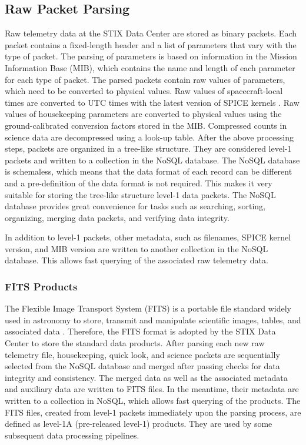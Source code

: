 \documentclass[referee]{aa} %
\begin{document}
\subsection{Raw Packet Parsing}
Raw telemetry data at the STIX Data Center are stored as binary packets. 
Each packet contains a fixed-length header and a list of parameters that vary with the type of packet.  The parsing of parameters is based on information in the Mission Information Base (MIB), which contains the name and length of each parameter for each type of packet. 
The parsed packets contain raw values of parameters, which need to be converted to physical values. 
Raw values of spacecraft-local times are converted to UTC times with the latest version of SPICE kernels \citep{spice1996,spice2018,spicedoi}.  Raw values of housekeeping parameters are converted to physical values using the ground-calibrated conversion factors stored in the MIB. 
Compressed counts in science data are decompressed using a look-up table. 
After the above processing steps, packets are organized in a tree-like structure. 
They are considered level-1 packets and written to a collection in the NoSQL database. 
The NoSQL database is schemaless, which means that the data format of each record can be different and a pre-definition of the data format is not required.
This makes it very suitable for storing the tree-like structure level-1 data packets.  
The NoSQL database provides great convenience  for tasks such as searching, sorting, organizing, merging data packets, and verifying data integrity.

In addition to level-1 packets, other metadata, such as filenames, SPICE kernel version, and MIB version are written to another collection in the NoSQL database.
This allows fast querying of the associated raw telemetry data.

\subsubsection{FITS Products}
The Flexible Image Transport System (FITS) is a portable file standard widely used in astronomy to store, transmit and manipulate scientific images, tables, and associated data \citep{fits}.
Therefore, the FITS format is adopted by the STIX Data Center to store the standard data products. 
After parsing each new raw telemetry file, housekeeping, quick look, and science packets are sequentially selected from the NoSQL database and merged after passing checks for data integrity and consistency.  The merged data as well as the associated metadata and auxiliary data are written to FITS files.  In the meantime, their metadata are written to a collection in NoSQL, which allows fast querying of the products. The FITS files, created from level-1 packets immediately upon the parsing process, are defined as level-1A (pre-released level-1) products.  They are used by some subsequent data processing pipelines.  
\end{document}
